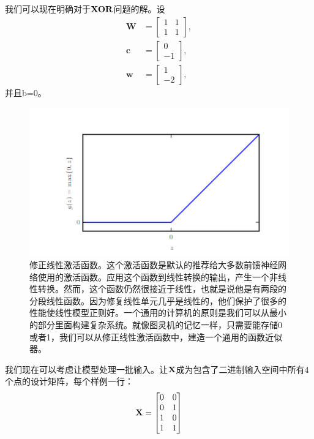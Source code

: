 我们可以现在明确对于$\bf{XOR}$问题的解。设
\begin{align}
\bm{W} &= \begin{bmatrix}
1 & 1\\
1 & 1
\end{bmatrix},\\
\bm{c} &= \begin{bmatrix}
0\\
-1
\end{bmatrix},\\
\bm{w} &= \begin{bmatrix}
1\\
-2
\end{bmatrix},
\end{align}
并且b=0。

\begin{figure}[htbp] %
   \centering
   \includegraphics[width=6in]{fig/chap6/6_3.png} 
   \centering
   \caption{修正线性激活函数。这个激活函数是默认的推荐给大多数前馈神经网络使用的激活函数。应用这个函数到线性转换的输出，产生一个非线性转换。然而，这个函数仍然很接近于线性，也就是说他是有两段的分段线性函数。因为修复线性单元几乎是线性的，他们保护了很多的性能使线性模型正则好。一个通用的计算机的原则是我们可以从最小的部分里面构建复杂系统。就像图灵机的记忆一样，只需要能存储0或者1，我们可以从修正线性激活函数中，建造一个通用的函数近似器。}
   \label{fig:6_3}
\end{figure}

我们现在可以考虑让模型处理一批输入。让$\bf{X}$成为包含了二进制输入空间中所有4个点的设计矩阵，每个样例一行：
\begin{equation}
\bf{X}=\begin{bmatrix}
0 & 0\\
0 & 1\\
1 & 0\\
1 & 1
\end{bmatrix}
\end{equation}

